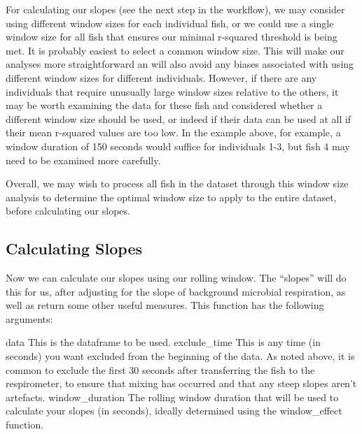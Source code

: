 \documentclass[
]{article}
\begin{document}
For calculating our slopes (see the next step in the workflow), we may
consider using different window sizes for each individual fish, or we
could use a single window size for all fish that ensures our minimal
r-squared threshold is being met. It is probably easiest to select a
common window size. This will make our analyses more straightforward an
will also avoid any biases associated with using different window sizes
for different individuals. However, if there are any individuals that
require unusually large window sizes relative to the others, it may be
worth examining the data for these fish and considered whether a
different window size should be used, or indeed if their data can be
used at all if their mean r-squared values are too low. In the example
above, for example, a window duration of 150 seconds would suffice for
individuals 1-3, but fish 4 may need to be examined more carefully.

Overall, we may wish to process all fish in the dataset through this
window size analysis to determine the optimal window size to apply to
the entire dataset, before calculating our slopes.

\subsection{Calculating Slopes}\label{calculating-slopes}

Now we can calculate our slopes using our rolling window. The ``slopes''
will do this for us, after adjusting for the slope of background
microbial respiration, as well as return some other useful measures.
This function has the following arguments:

data This is the dataframe to be used. exclude\_time This is any time
(in seconds) you want excluded from the beginning of the data. As noted
above, it is common to exclude the first 30 seconds after transferring
the fish to the respirometer, to ensure that mixing has occurred and
that any steep slopes aren't artefacts. window\_duration The rolling
window duration that will be used to calculate your slopes (in seconds),
ideally determined using the window\_effect function.
\end{document}
